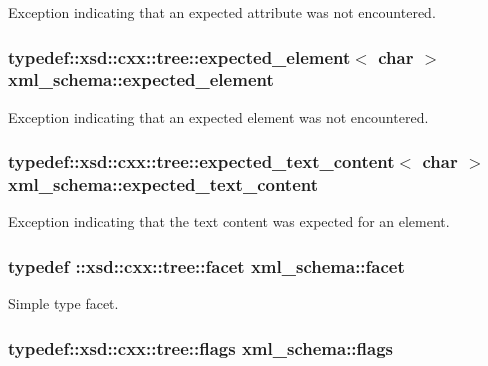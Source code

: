 Exception indicating that an expected attribute was not encountered. 

\hypertarget{namespacexml__schema_a8deca57d1e322d97eea32518a7237a49}{
\subsubsection[{expected\-\_\-element}]{\setlength{\rightskip}{0pt plus 5cm}typedef\-::xsd\-::cxx\-::tree\-::expected\-\_\-element$<$ char $>$ {\bf xml\-\_\-schema\-::expected\-\_\-element}}}\label{namespacexml__schema_a8deca57d1e322d97eea32518a7237a49}


Exception indicating that an expected element was not encountered. 

\hypertarget{namespacexml__schema_ad0938777db5685ea04372a964518e87b}{
\subsubsection[{expected\-\_\-text\-\_\-content}]{\setlength{\rightskip}{0pt plus 5cm}typedef\-::xsd\-::cxx\-::tree\-::expected\-\_\-text\-\_\-content$<$ char $>$ {\bf xml\-\_\-schema\-::expected\-\_\-text\-\_\-content}}}\label{namespacexml__schema_ad0938777db5685ea04372a964518e87b}


Exception indicating that the text content was expected for an element. 

\hypertarget{namespacexml__schema_ae447ddf0dd2470b5a095774e0b359a86}{
\subsubsection[{facet}]{\setlength{\rightskip}{0pt plus 5cm}typedef \-::xsd\-::cxx\-::tree\-::facet {\bf xml\-\_\-schema\-::facet}}}\label{namespacexml__schema_ae447ddf0dd2470b5a095774e0b359a86}


Simple type facet. 

\hypertarget{namespacexml__schema_a0612287d030cb2732d31a45b258fdc87}{
\subsubsection[{flags}]{\setlength{\rightskip}{0pt plus 5cm}typedef\-::xsd\-::cxx\-::tree\-::flags {\bf xml\-\_\-schema\-::flags}}}\label{namespacexml__schema_a0612287d030cb2732d31a45b258fdc87}


